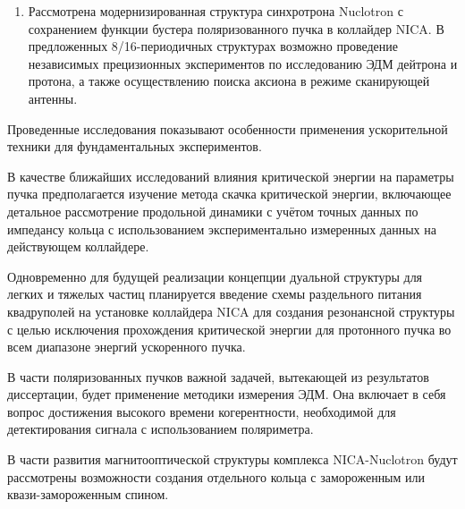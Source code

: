 \begin{enumerate}
  \item Рассмотрена модернизированная структура синхротрона Nuclotron с сохранением функции бустера поляризованного пучка в коллайдер NICA. В предложенных 8/16-периодичных структурах возможно проведение независимых прецизионных экспериментов по исследованию ЭДМ дейтрона и протона, а также осуществлению поиска аксиона в режиме сканирующей антенны.
  
\end{enumerate}

\par Проведенные исследования показывают особенности применения ускорительной техники для фундаментальных экспериментов.

\par В качестве ближайших исследований влияния критической энергии на параметры пучка предполагается изучение метода скачка критической энергии, включающее детальное рассмотрение продольной динамики с учётом точных данных по импедансу кольца с использованием экспериментально измеренных данных на действующем коллайдере.

\par Одновременно для будущей реализации концепции дуальной структуры для легких и тяжелых частиц планируется введение схемы раздельного питания квадруполей на установке коллайдера NICA для создания резонансной структуры с целью исключения прохождения критической энергии для протонного пучка во всем диапазоне энергий ускоренного пучка. 

\par В части поляризованных пучков важной задачей, вытекающей из результатов диссертации, будет применение методики измерения ЭДМ. Она включает в себя вопрос достижения высокого времени когерентности, необходимой для детектирования сигнала с использованием поляриметра. 

\par В части развития магнитооптической структуры комплекса NICA-Nuclotron будут рассмотрены возможности создания отдельного кольца с замороженным или квази-замороженным спином. 






